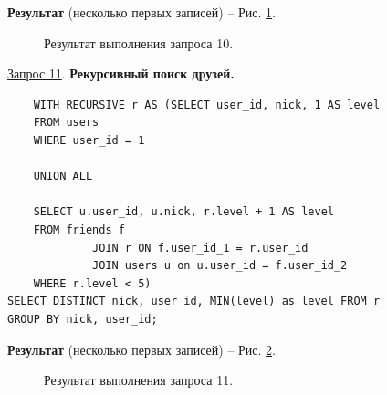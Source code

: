 \documentclass[a4paper,12pt]{article}
\begin{document}
\textbf{Результат} (несколько первых записей) -- Рис. \ref{fig:request10}.

\begin{figure}[ht]
    \caption{Результат выполнения запроса 10.}
    \label{fig:request10}
\end{figure}

\underline{Запрос 11}. \textbf{Рекурсивный поиск друзей.}
\begin{lstlisting}
    WITH RECURSIVE r AS (SELECT user_id, nick, 1 AS level
    FROM users
    WHERE user_id = 1

    UNION ALL

    SELECT u.user_id, u.nick, r.level + 1 AS level
    FROM friends f
             JOIN r ON f.user_id_1 = r.user_id
             JOIN users u on u.user_id = f.user_id_2
    WHERE r.level < 5)
SELECT DISTINCT nick, user_id, MIN(level) as level FROM r
GROUP BY nick, user_id;
    \end{lstlisting}

\textbf{Результат} (несколько первых записей) -- Рис. \ref{fig:request11}.

\begin{figure}[ht]
    \caption{Результат выполнения запроса 11.}
    \label{fig:request11}
\end{figure}
\end{document}
